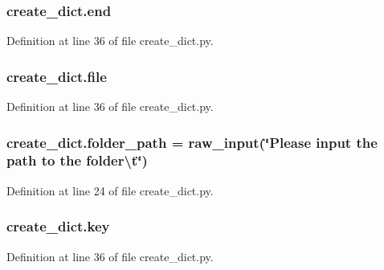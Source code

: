 \subsubsection[{\texorpdfstring{end}{end}}]{\setlength{\rightskip}{0pt plus 5cm}create\+\_\+dict.\+end}\hypertarget{namespacecreate__dict_ad4b19f0708a580bdf8ef5f3b5a08d1d2}{}\label{namespacecreate__dict_ad4b19f0708a580bdf8ef5f3b5a08d1d2}


Definition at line 36 of file create\+\_\+dict.\+py.

\subsubsection[{\texorpdfstring{file}{file}}]{\setlength{\rightskip}{0pt plus 5cm}create\+\_\+dict.\+file}\hypertarget{namespacecreate__dict_a0384d7d11a827e9e7084abff1ac79190}{}\label{namespacecreate__dict_a0384d7d11a827e9e7084abff1ac79190}


Definition at line 36 of file create\+\_\+dict.\+py.

\subsubsection[{\texorpdfstring{folder\+\_\+path}{folder_path}}]{\setlength{\rightskip}{0pt plus 5cm}create\+\_\+dict.\+folder\+\_\+path = raw\+\_\+input(\char`\"{}Please input the path to the folder\textbackslash{}t\char`\"{})}\hypertarget{namespacecreate__dict_a94c0ed0928396d28700235a31621124f}{}\label{namespacecreate__dict_a94c0ed0928396d28700235a31621124f}


Definition at line 24 of file create\+\_\+dict.\+py.

\subsubsection[{\texorpdfstring{key}{key}}]{\setlength{\rightskip}{0pt plus 5cm}create\+\_\+dict.\+key}\hypertarget{namespacecreate__dict_aef9478241bf84f48b590aab0c0bbfc63}{}\label{namespacecreate__dict_aef9478241bf84f48b590aab0c0bbfc63}


Definition at line 36 of file create\+\_\+dict.\+py.

